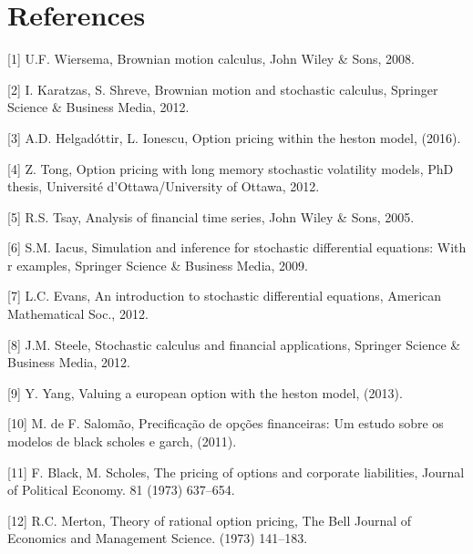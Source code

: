 \documentclass[12pt,twoside]{reedthesis}
\theoremstyle{definition}
\theoremstyle{definition}
\theoremstyle{remark}
\begin{document}
  \chapter*{References}\label{references}
  
  \hypertarget{refs}{}
  \hypertarget{ref-ubbo}{}
  {[}1{]} U.F. Wiersema, Brownian motion calculus, John Wiley \& Sons,
  2008.
  
  \hypertarget{ref-karatzas2012brownian}{}
  {[}2{]} I. Karatzas, S. Shreve, Brownian motion and stochastic calculus,
  Springer Science \& Business Media, 2012.
  
  \hypertarget{ref-helgadottir2016option}{}
  {[}3{]} A.D. Helgadóttir, L. Ionescu, Option pricing within the heston
  model, (2016).
  
  \hypertarget{ref-tong2012option}{}
  {[}4{]} Z. Tong, Option pricing with long memory stochastic volatility
  models, PhD thesis, Université d'Ottawa/University of Ottawa, 2012.
  
  \hypertarget{ref-tsay2005analysis}{}
  {[}5{]} R.S. Tsay, Analysis of financial time series, John Wiley \&
  Sons, 2005.
  
  \hypertarget{ref-iacus2009simulation}{}
  {[}6{]} S.M. Iacus, Simulation and inference for stochastic differential
  equations: With r examples, Springer Science \& Business Media, 2009.
  
  \hypertarget{ref-evans2012introduction}{}
  {[}7{]} L.C. Evans, An introduction to stochastic differential
  equations, American Mathematical Soc., 2012.
  
  \hypertarget{ref-steele2012stochastic}{}
  {[}8{]} J.M. Steele, Stochastic calculus and financial applications,
  Springer Science \& Business Media, 2012.
  
  \hypertarget{ref-yang2013valuing}{}
  {[}9{]} Y. Yang, Valuing a european option with the heston model,
  (2013).
  
  \hypertarget{ref-salomao2011precificaccao}{}
  {[}10{]} M. de F. Salomão, Precificação de opções financeiras: Um estudo
  sobre os modelos de black scholes e garch, (2011).
  
  \hypertarget{ref-black1973pricing}{}
  {[}11{]} F. Black, M. Scholes, The pricing of options and corporate
  liabilities, Journal of Political Economy. 81 (1973) 637--654.
  
  \hypertarget{ref-merton1973theory}{}
  {[}12{]} R.C. Merton, Theory of rational option pricing, The Bell
  Journal of Economics and Management Science. (1973) 141--183.
  
\end{document}
